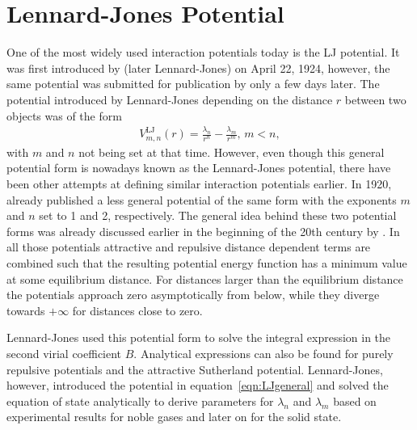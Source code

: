 \section{Lennard-Jones Potential}
\label{sec:LennardJones}

One of the most widely used interaction potentials today is the \ac{LJ}
potential. It was first introduced by
\citeauthor{Jones_DeterminationMolecularFields_1924} (later Lennard-Jones) on
April 22, 1924\autocite{Jones_DeterminationMolecularFields_1924}, however, the
same potential was submitted for publication by
\citeauthor{Simon_KristallstrukturArgons_1924} only a few days
later.\autocite{Simon_KristallstrukturArgons_1924} The potential introduced by
Lennard-Jones depending on the distance $r$ between two objects was of the form
%
\begin{align}
    V_{m,n}^\text{LJ}(r)=\frac{\lambda_n}{r^n}-\frac{\lambda_m}{r^m},\, m<n,\label{eqn:LJgeneral}
\end{align}
%
with $m$ and $n$ not being set at that time. However, even though this general
potential form is nowadays known as the Lennard-Jones potential, there have
been other attempts at defining similar interaction
potentials earlier. In 1920,
\citeauthor{Kratzer_ultrarotenRotationsspektrenHalogenwasserstoffe_1920}\autocite{Kratzer_ultrarotenRotationsspektrenHalogenwasserstoffe_1920}
already published a less general potential of the same form with the exponents
$m$ and $n$ set to 1 and 2, respectively. The general idea behind these two
potential forms was already discussed earlier in the beginning of the 20th
century by
\citeauthor{Mie_ZurkinetischenTheorie_1903}\autocite{Mie_ZurkinetischenTheorie_1903}.
In all those potentials attractive and repulsive distance dependent terms are
combined such that the resulting potential energy function has a minimum value
at some equilibrium distance. For distances larger than the equilibrium distance
the potentials approach zero asymptotically from below, while they diverge
towards $+\infty$ for distances close to zero.

Lennard-Jones used this potential form to solve the integral expression in the
second virial coefficient $B$. Analytical expressions can also be found for
purely repulsive potentials and the attractive Sutherland potential.
Lennard-Jones, however, introduced the potential in
equation~\eqref{eqn:LJgeneral} and solved the equation of state analytically to
derive parameters for $\lambda_n$ and $\lambda_m$ based on experimental results
for noble gases\autocite{Jones_DeterminationMolecularFields_1924} and later on
for the solid state.\autocite{Jones_calculationcertaincrystal_1925}

